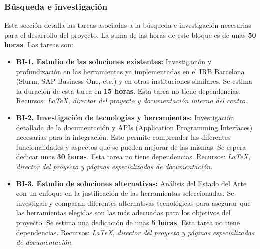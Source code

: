 \subsubsection{Búsqueda e investigación}
Esta sección detalla las tareas asociadas a la búsqueda e investigación necesarias para el desarrollo del proyecto.
La suma de las horas de este bloque es de unas \textbf{50 horas}. Las tareas son: 
\begin{itemize}
    \item \textbf{BI-1. Estudio de las soluciones existentes:} Investigación y profundización en las herramientas ya implementadas en el 
    IRB Barcelona (Slurm, SAP Business One, etc.) y en otras instituciones similares. Se estima la duración de esta tarea en \textbf{15 horas}.
    \newline Esta tarea no tiene dependencias.
    \newline Recursos: \textit {LaTeX, director del proyecto y documentación interna del centro.}
    
    \item \textbf{BI-2. Investigación de tecnologías y herramientas:} Investigación detallada de la documentación y APIs (Application 
    Programming Interfaces) necesarias para la integración. Esto permite comprender las diferentes funcionalidades y 
    aspectos que se pueden mejorar de las mismas. Se espera dedicar unas \textbf{30 horas}.
    \newline Esta tarea no tiene dependencias.
    \newline Recursos: \textit {LaTeX, director del proyecto y páginas especializadas de documentación.}
    
    \item \textbf{BI-3. Estudio de soluciones alternativas:} Análisis del Estado del Arte con un enfoque en la justificación de las herramientas seleccionadas.
    Se investigan y comparan diferentes alternativas tecnológicas para asegurar que las herramientas elegidas son las más adecuadas para los objetivos del proyecto. Se estima una dedicación de unas \textbf{5 horas}.
    \newline Esta tarea no tiene dependencias.
    \newline Recursos: \textit {LaTeX, director del proyecto y páginas especializadas de documentación.}
\end{itemize}